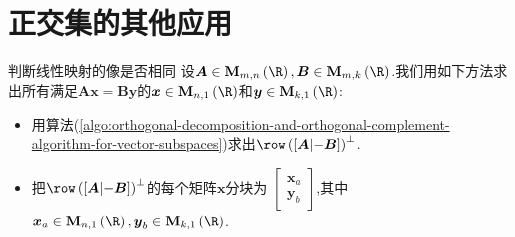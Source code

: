 \section{正交集的其他应用}

\begin{example}{判断线性映射的像是否相同}{}
	设$\boldsymbol{A}\in\mathbf{M}_{m,n}\left(\R\right),\boldsymbol{B}\in\mathbf{M}_{m,k}\left(\R\right)$.我们用如下方法求出所有满足$\boldsymbol{A}\boldsymbol{x}=\boldsymbol{B}\boldsymbol{y}$的$\boldsymbol{x}\in\mathbf{M}_{n,1}\left(\R\right)$和$\boldsymbol{y}\in\mathbf{M}_{k,1}\left(\R\right)$:
	\begin{itemize}
		\item 用算法(\ref{algo:orthogonal-decomposition-and-orthogonal-complement-algorithm-for-vector-subspaces})求出$\row\left(\left[\boldsymbol{A}\middle|-\boldsymbol{B}\right]\right)^{\perp}$.
		\item 把$\row\left(\left[\boldsymbol{A}\middle|-\boldsymbol{B}\right]\right)^{\perp}$的每个矩阵$\boldsymbol{x}$分块为
		$\begin{bmatrix}
			\boldsymbol{x}_{a}\\
			\boldsymbol{y}_{b}
		\end{bmatrix}$,其中$\boldsymbol{x}_{a}\in\mathbf{M}_{n,1}\left(\R\right),\boldsymbol{y}_{b}\in\mathbf{M}_{k,1}\left(\R\right)$.
	\end{itemize}
\end{example}

